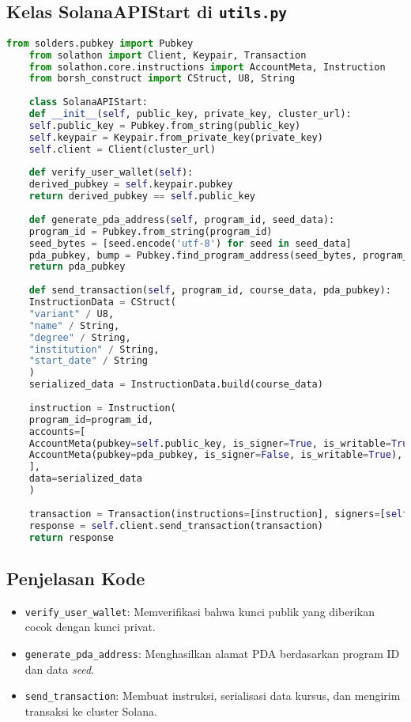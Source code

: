\subsection{Kelas SolanaAPIStart di \texttt{utils.py}}
\begin{lstlisting}[language=Python]
	from solders.pubkey import Pubkey
	from solathon import Client, Keypair, Transaction
	from solathon.core.instructions import AccountMeta, Instruction
	from borsh_construct import CStruct, U8, String
	
	class SolanaAPIStart:
	def __init__(self, public_key, private_key, cluster_url):
	self.public_key = Pubkey.from_string(public_key)
	self.keypair = Keypair.from_private_key(private_key)
	self.client = Client(cluster_url)
	
	def verify_user_wallet(self):
	derived_pubkey = self.keypair.pubkey
	return derived_pubkey == self.public_key
	
	def generate_pda_address(self, program_id, seed_data):
	program_id = Pubkey.from_string(program_id)
	seed_bytes = [seed.encode('utf-8') for seed in seed_data]
	pda_pubkey, bump = Pubkey.find_program_address(seed_bytes, program_id)
	return pda_pubkey
	
	def send_transaction(self, program_id, course_data, pda_pubkey):
	InstructionData = CStruct(
	"variant" / U8,
	"name" / String,
	"degree" / String,
	"institution" / String,
	"start_date" / String
	)
	serialized_data = InstructionData.build(course_data)
	
	instruction = Instruction(
	program_id=program_id,
	accounts=[
	AccountMeta(pubkey=self.public_key, is_signer=True, is_writable=True),
	AccountMeta(pubkey=pda_pubkey, is_signer=False, is_writable=True),
	],
	data=serialized_data
	)
	
	transaction = Transaction(instructions=[instruction], signers=[self.keypair])
	response = self.client.send_transaction(transaction)
	return response
\end{lstlisting}

\subsection{Penjelasan Kode}
\begin{itemize}
	\item \texttt{verify\_user\_wallet}: Memverifikasi bahwa kunci publik yang diberikan cocok dengan kunci privat.
	\item \texttt{generate\_pda\_address}: Menghasilkan alamat PDA berdasarkan program ID dan data \textit{seed}.
	\item \texttt{send\_transaction}: Membuat instruksi, serialisasi data kursus, dan mengirim transaksi ke cluster Solana.
\end{itemize}

